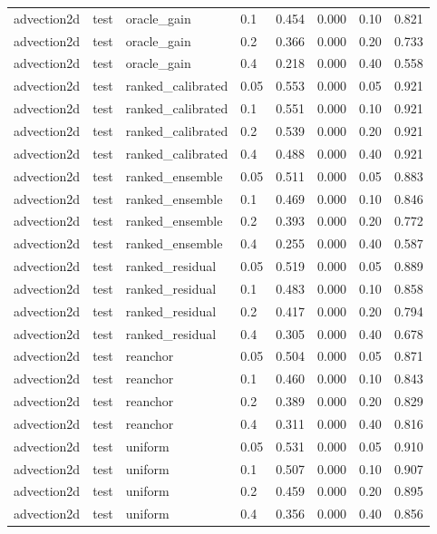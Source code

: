 \begin{longtable}{llllrrrr}
advection2d & test & oracle\_gain & 0.1 & 0.454 & 0.000 & 0.10 & 0.821 \\
advection2d & test & oracle\_gain & 0.2 & 0.366 & 0.000 & 0.20 & 0.733 \\
advection2d & test & oracle\_gain & 0.4 & 0.218 & 0.000 & 0.40 & 0.558 \\
advection2d & test & ranked\_calibrated & 0.05 & 0.553 & 0.000 & 0.05 & 0.921 \\
advection2d & test & ranked\_calibrated & 0.1 & 0.551 & 0.000 & 0.10 & 0.921 \\
advection2d & test & ranked\_calibrated & 0.2 & 0.539 & 0.000 & 0.20 & 0.921 \\
advection2d & test & ranked\_calibrated & 0.4 & 0.488 & 0.000 & 0.40 & 0.921 \\
advection2d & test & ranked\_ensemble & 0.05 & 0.511 & 0.000 & 0.05 & 0.883 \\
advection2d & test & ranked\_ensemble & 0.1 & 0.469 & 0.000 & 0.10 & 0.846 \\
advection2d & test & ranked\_ensemble & 0.2 & 0.393 & 0.000 & 0.20 & 0.772 \\
advection2d & test & ranked\_ensemble & 0.4 & 0.255 & 0.000 & 0.40 & 0.587 \\
advection2d & test & ranked\_residual & 0.05 & 0.519 & 0.000 & 0.05 & 0.889 \\
advection2d & test & ranked\_residual & 0.1 & 0.483 & 0.000 & 0.10 & 0.858 \\
advection2d & test & ranked\_residual & 0.2 & 0.417 & 0.000 & 0.20 & 0.794 \\
advection2d & test & ranked\_residual & 0.4 & 0.305 & 0.000 & 0.40 & 0.678 \\
advection2d & test & reanchor & 0.05 & 0.504 & 0.000 & 0.05 & 0.871 \\
advection2d & test & reanchor & 0.1 & 0.460 & 0.000 & 0.10 & 0.843 \\
advection2d & test & reanchor & 0.2 & 0.389 & 0.000 & 0.20 & 0.829 \\
advection2d & test & reanchor & 0.4 & 0.311 & 0.000 & 0.40 & 0.816 \\
advection2d & test & uniform & 0.05 & 0.531 & 0.000 & 0.05 & 0.910 \\
advection2d & test & uniform & 0.1 & 0.507 & 0.000 & 0.10 & 0.907 \\
advection2d & test & uniform & 0.2 & 0.459 & 0.000 & 0.20 & 0.895 \\
advection2d & test & uniform & 0.4 & 0.356 & 0.000 & 0.40 & 0.856 \\

\end{longtable}
